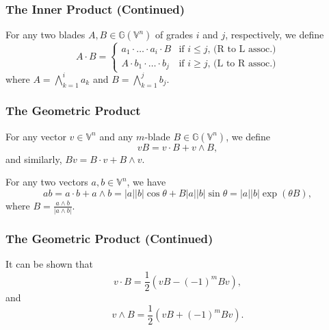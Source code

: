 \documentclass{beamer}
\newcommand{\G}{\mathbb{G}}
\newcommand{\V}{\mathbb{V}}
\begin{document}
\begin{frame}
\frametitle{The Inner Product (Continued)}
\begin{definition}
For any two blades $A,B\in\G(\V^n)$ of grades $i$ and $j$, respectively, we define
\begin{equation*}
A\cdot B = \left\{
\begin{array}{ll}
a_1\cdot\dots\cdot a_i\cdot B & \mbox{if $i\leq j$, (R to L assoc.)} \\
A\cdot b_1\cdot\dots\cdot b_j & \mbox{if $i\geq j$, (L to R assoc.)}
\end{array}
\right.
\end{equation*}
where $A=\bigwedge_{k=1}^i a_k$ and $B=\bigwedge_{k=1}^j b_j$.
\end{definition}
\end{frame}

\begin{frame}
\frametitle{The Geometric Product}
\begin{definition}
For any vector $v\in\V^n$ and any $m$-blade $B\in\G(\V^n)$, we define
\begin{equation*}
vB = v\cdot B + v\wedge B,
\end{equation*}
and similarly, $Bv = B\cdot v + B\wedge v$.
\end{definition}
\begin{example}
For any two vectors $a,b\in\V^n$, we have
\begin{equation*}
ab = a\cdot b + a\wedge b = |a||b|\cos\theta + B|a||b|\sin\theta = |a||b|\exp(\theta B),
\end{equation*}
where $B = \frac{a\wedge b}{|a\wedge b|}$.
\end{example}
\end{frame}

\begin{frame}
\frametitle{The Geometric Product (Continued)}
\begin{example}
It can be shown that
\begin{equation*}
v\cdot B = \frac{1}{2}(vB - (-1)^m Bv),
\end{equation*}
and
\begin{equation*}
v\wedge B = \frac{1}{2}(vB + (-1)^m Bv).
\end{equation*}
\end{example}
\end{frame}
\end{document}
